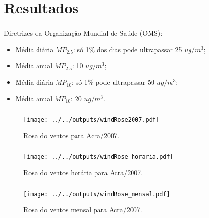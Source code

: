 \section{Resultados}

\begin{frame}
  \frametitle{}
%   
   Diretrizes da Organização Mundial de Saúde (OMS):
  \begin{itemize}
    \item Média diária $MP_{2.5}$: só 1\% dos dias pode ultrapassar 25 $ug/m^3$;
    \item Média anual $MP_{2.5}$: 10 $ug/m^3$;
    \item Média diária $MP_{10}$: só 1\%  pode ultrapassar 50 $ug/m^3$;
    \item Média anual $MP_{10}$: 20 $ug/m^3$.
  \end{itemize}
\end{frame}

\begin{frame}
  \frametitle{}
  \begin{figure}[H]
    \centering
    \texttt{[image: ../../outputs/windRose2007.pdf]}
    \caption{Rosa do ventos para Acra/2007. \label{fg:rosaCompleta}}
  \end{figure}
\end{frame}


\begin{frame}
  \frametitle{}
  \begin{figure}[H]
    \centering
    \texttt{[image: ../../outputs/windRose\_horaria.pdf]}
    \caption{Rosa do ventos horária para Acra/2007. \label{fig:windRose_horaria}}
  \end{figure}
\end{frame}


\begin{frame}
  \frametitle{}
  \begin{figure}[H]
    \centering
    \texttt{[image: ../../outputs/windRose\_mensal.pdf]}
    \caption{Rosa do ventos mensal para Acra/2007. \label{fig:windRose_mensal}}
  \end{figure}
\end{frame}



